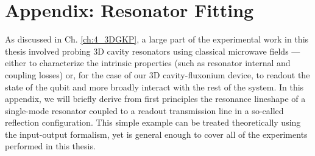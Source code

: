 \chapter{Appendix: Resonator Fitting\label{ch:AppA}}

As discussed in Ch. \ref{ch:4_3DGKP}, a large part of the experimental work in this thesis involved probing 3D cavity resonators using classical microwave fields --- either to characterize the intrinsic properties (such as resonator internal and coupling losses) or, for the case of our 3D cavity-fluxonium device, to readout the state of the qubit and more broadly interact with the rest of the system. In this appendix, we will briefly derive from first principles the resonance lineshape of a single-mode resonator coupled to a readout transmission line in a so-called reflection configuration. This simple example can be treated theoretically using the input-output formalism, yet is general enough to cover all of the experiments performed in this thesis. 


